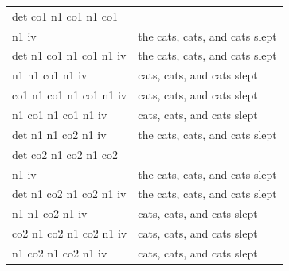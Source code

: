 \documentclass[11pt]{article}
\begin{document}
\begin{tabular}{ll}
det co1 n1 co1 n1 co1 & \\
\phantom{...}n1 iv & the cats, cats, and cats slept\\
det n1 co1 n1 co1 n1 iv & the cats, cats, and cats slept\\
n1 n1 co1 n1 iv & cats, cats, and cats slept\\
co1 n1 co1 n1 co1 n1 iv & cats, cats, and cats slept\\
n1 co1 n1 co1 n1 iv & cats, cats, and cats slept\\
det n1 n1 co2 n1 iv & the cats, cats, and cats slept\\
det co2 n1 co2 n1 co2 & \\
\phantom{...}n1 iv & the cats, cats, and cats slept\\
det n1 co2 n1 co2 n1 iv & the cats, cats, and cats slept\\
n1 n1 co2 n1 iv & cats, cats, and cats slept\\
co2 n1 co2 n1 co2 n1 iv & cats, cats, and cats slept\\
n1 co2 n1 co2 n1 iv & cats, cats, and cats slept\\
\end{tabular}
\end{document}
